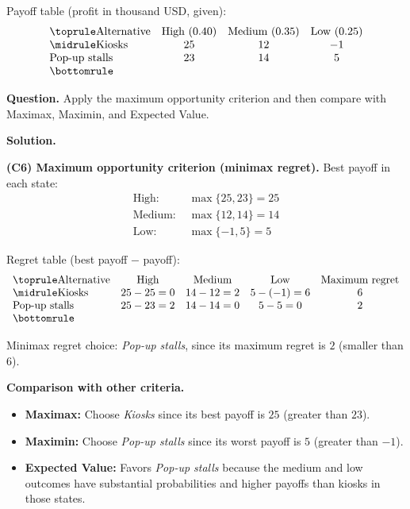 	Payoff table (profit in thousand USD, given):
	\[
	\begin{array}{lccc}
		\toprule
		\text{Alternative} & \text{High }(0.40) & \text{Medium }(0.35) & \text{Low }(0.25)\\
		\midrule
		\text{Kiosks} & 25 & 12 & -1\\
		\text{Pop-up stalls} & 23 & 14 & 5\\
		\bottomrule
	\end{array}
	\]
	
	\textbf{Question.} Apply the maximum opportunity criterion and then compare with Maximax, Maximin, and Expected Value.
	
	\textbf{Solution.}
	
	\textbf{(C6) Maximum opportunity criterion (minimax regret).} Best payoff in each state:
	\[
	\begin{aligned}
		\text{High: } &\max\{25, 23\} = 25\\
		\text{Medium: } &\max\{12, 14\} = 14\\
		\text{Low: } &\max\{-1, 5\} = 5
	\end{aligned}
	\]
	
	Regret table (best payoff $-$ payoff):
	\[
	\begin{array}{lcccc}
		\toprule
		\text{Alternative} & \text{High} & \text{Medium} & \text{Low} & \text{Maximum regret}\\
		\midrule
		\text{Kiosks} & 25-25=0 & 14-12=2 & 5-(-1)=6 & 6\\
		\text{Pop-up stalls} & 25-23=2 & 14-14=0 & 5-5=0 & 2\\
		\bottomrule
	\end{array}
	\]
	
	Minimax regret choice: \emph{Pop-up stalls}, since its maximum regret is $2$ (smaller than $6$).
	
	\textbf{Comparison with other criteria.}
	\begin{itemize}
		\item \textbf{Maximax:} Choose \emph{Kiosks} since its best payoff is $25$ (greater than $23$).
		\item \textbf{Maximin:} Choose \emph{Pop-up stalls} since its worst payoff is $5$ (greater than $-1$).
		\item \textbf{Expected Value:} Favors \emph{Pop-up stalls} because the medium and low outcomes have substantial probabilities and higher payoffs than kiosks in those states.
	\end{itemize}
	
	
	
